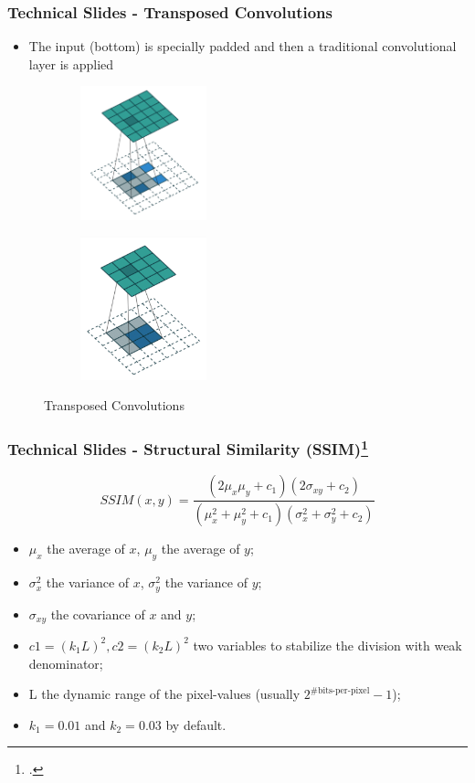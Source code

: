 \documentclass{beamer}
\begin{document}
\begin{frame}
\frametitle{Technical Slides - Transposed Convolutions}
\begin{itemize}
	\item The input (bottom) is specially padded and then a traditional convolutional layer is applied
\end{itemize}
\begin{figure}
	\centering
	\begin{subfigure}
		\centering
    	\includegraphics[width=0.4\textwidth]{transposed_convolution.png}
    \end{subfigure}
    \begin{subfigure}
		\centering
        \includegraphics[width=0.4\textwidth]{transposed_convolution2.png}
    \end{subfigure}
    \caption{Transposed Convolutions}
\end{figure}
\end{frame}

\begin{frame}
\frametitle{Technical Slides - Structural Similarity (SSIM)\footcite{Wang:2004:IQA:2319031.2320551}}
\center
	\[
		SSIM(x,y) = \frac{(2 \mu_x \mu_y + c_1)(2\sigma_{xy} + c_2)}{(\mu_x^2 + \mu_y^2 + c_1)(\sigma_x^2 + \sigma_y^2 + c_2)}
	\]
\begin{itemize}
	\item \(\mu_x\) the average of \(x\), \(\mu_y\) the average of \(y\);
	\item \(\sigma_x^2\) the variance of \(x\), \(\sigma_y^2\) the variance of \(y\);	
	\item \(\sigma_{xy}\) the covariance of \(x\) and \(y\);
	\item \(c1=(k_1L)^2, c2=(k_2L)^2\) two variables to stabilize the division with weak denominator;
	\item L the dynamic range of the pixel-values (usually \(2^{\text{\#bits-per-pixel}}-1\));
	\item \(k_1=0.01\) and \(k_2=0.03\) by default.
\end{itemize}
\end{frame}
\end{document}
